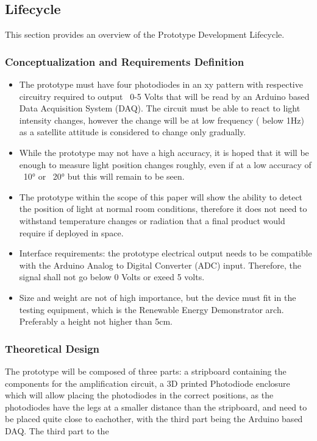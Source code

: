 \subsection{Lifecycle}
This section provides an overview of the Prototype Development Lifecycle.

\subsubsection*{Conceptualization and Requirements Definition}
\begin{itemize}
  \item The prototype must have four photodiodes in an xy pattern with respective circuitry required to output ~0-5 Volts that will be read by an Arduino based Data Acquisition System (DAQ). The circuit must be able to react to light intensity changes, however the change will be at low frequency ( below 1Hz) as a satellite attitude is considered to change only gradually.
  \item While the prototype may not have a high accuracy, it is hoped that it will be enough to measure light position changes roughly, even if at a low accuracy of ~10° or ~20° but this will remain to be seen.  
  \item The prototype within the scope of this paper will show the ability to detect the position of light at normal room conditions, therefore it does not need to withstand temperature changes or radiation that a final product would require if deployed in space.
  \item Interface requirements: the prototype electrical output needs to be compatible with the Arduino Analog to Digital Converter (ADC) input. Therefore, the signal shall not go below 0 Volts or exeed 5 volts. 
  \item Size and weight are not of high importance, but the device must fit in the testing equipment, which is the Renewable Energy Demonstrator arch. Preferably a height not higher than 5cm.
\end{itemize}

\subsubsection*{Theoretical Design}
The prototype will be composed of three parts: a stripboard containing the components for the amplification circuit,  a 3D printed Photodiode enclosure which will allow placing the photodiodes in the correct positions, as the photodiodes have the legs at a smaller distance than the stripboard, and need to be placed quite close to eachother, with the third part being the Arduino based DAQ. 
%
The third part to the 


